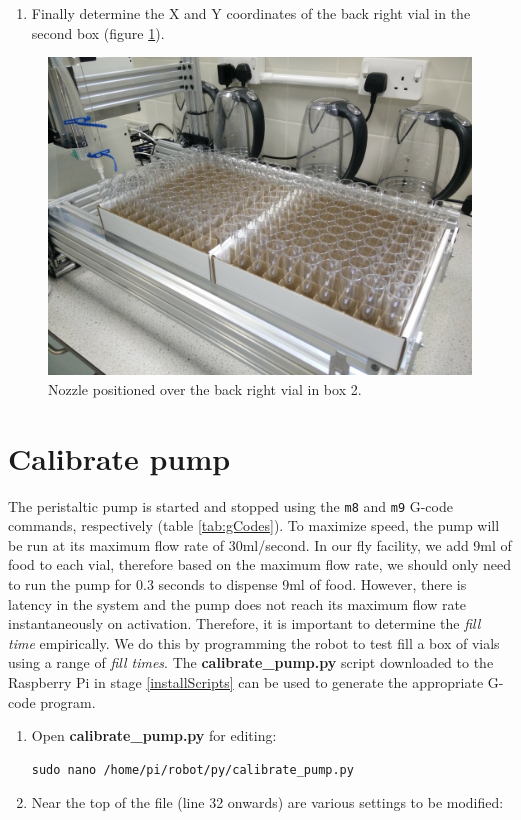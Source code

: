 \documentclass[]{book}
\providecommand{\tightlist}{%
  \setlength{\itemsep}{0pt}\setlength{\parskip}{0pt}}
\theoremstyle{definition}
\theoremstyle{definition}
\theoremstyle{remark}
\begin{document}
\begin{enumerate}
\def\labelenumi{\arabic{enumi}.}
\setcounter{enumi}{7}
\tightlist
\item
  Finally determine the X and Y coordinates of the back right vial in
  the second box (figure \ref{fig:box2BackRight}).
\end{enumerate}

\begin{figure}

{\centering \includegraphics[width=0.5\linewidth]{images/box2_last_vial} 

}

\caption{Nozzle positioned over the back right vial in box 2.}\label{fig:box2BackRight}
\end{figure}

\section{Calibrate pump}\label{calibrate-pump}

The peristaltic pump is started and stopped using the \texttt{m8} and
\texttt{m9} G-code commands, respectively (table \ref{tab:gCodes}). To
maximize speed, the pump will be run at its maximum flow rate of
30ml/second. In our fly facility, we add 9ml of food to each vial,
therefore based on the maximum flow rate, we should only need to run the
pump for 0.3 seconds to dispense 9ml of food. However, there is latency
in the system and the pump does not reach its maximum flow rate
instantaneously on activation. Therefore, it is important to determine
the \emph{fill time} empirically. We do this by programming the robot to
test fill a box of vials using a range of \emph{fill times}. The
\textbf{calibrate\_pump.py} script downloaded to the Raspberry Pi in
stage \ref{installScripts} can be used to generate the appropriate
G-code program.

\begin{enumerate}
\def\labelenumi{\arabic{enumi}.}
\item
  Open \textbf{calibrate\_pump.py} for editing:

\begin{verbatim}
sudo nano /home/pi/robot/py/calibrate_pump.py
\end{verbatim}
\item
  Near the top of the file (line 32 onwards) are various settings to be
  modified:
\end{enumerate}
\end{document}
